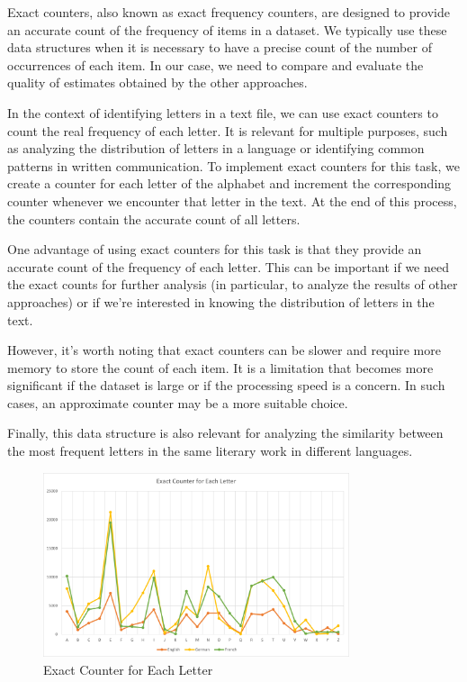 \documentclass[]{revdetua}
\begin{document}
Exact counters, also known as exact frequency counters, are designed to provide an accurate count of the frequency of items in a dataset. We typically use these data structures when it is necessary to have a precise count of the number of occurrences of each item. In our case, we need to compare and evaluate the quality of estimates obtained by the other approaches.

In the context of identifying letters in a text file, we can use exact counters to count the real frequency of each letter. It is relevant for multiple purposes, such as analyzing the distribution of letters in a language or identifying common patterns in written communication. To implement exact counters for this task, we create a counter for each letter of the alphabet and increment the corresponding counter whenever we encounter that letter in the text. At the end of this process, the counters contain the accurate count of all letters.

One advantage of using exact counters for this task is that they provide an accurate count of the frequency of each letter. This can be important if we need the exact counts for further analysis (in particular, to analyze the results of other approaches) or if we're interested in knowing the distribution of letters in the text.

However, it's worth noting that exact counters can be slower and require more memory to store the count of each item. It is a limitation that becomes more significant if the dataset is large or if the processing speed is a concern. In such cases, an approximate counter may be a more suitable choice.

Finally, this data structure is also relevant for analyzing the similarity between the most frequent letters in the same literary work in different languages.

\begin{figure}[H]
    \centering
    \includegraphics[width=9cm]{Exact Counter for Each Letter.png}
    \caption{Exact Counter for Each Letter}
\end{figure}
\end{document}
